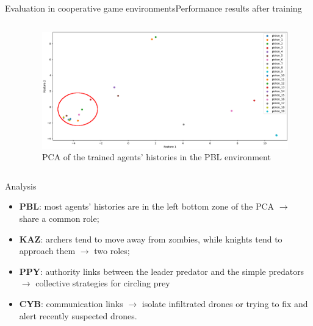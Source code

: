 \begin{frame}[allowframebreaks]{Evaluation in cooperative game environments}{Performance results after training}

    \begin{columns}

        \begin{column}{0.3\textwidth}
            { \tiny
                
            }

        \end{column}

        \hspace{1ex}

        \begin{column}{0.7\textwidth}
            \begin{figure}[h!]
                \centering
                \includegraphics[width=\textwidth]{figures/prahom_pca_analysis.png}
                \caption{PCA of the trained agents' histories in the PBL environment}
                \label{fig:prahom_pca_analysis}
            \end{figure}
        \end{column}

    \end{columns}

    \begin{block}{Analysis}
        \begin{itemize}
            \item \textbf{PBL}: most agents’ histories are in the left bottom zone of the PCA $\rightarrow$ share a common role;
            \item \textbf{KAZ}: archers tend to move away from zombies, while knights tend to approach them $\rightarrow$ two roles;
            \item \textbf{PPY}: authority links between the leader predator and the simple predators $\rightarrow$ collective strategies for circling prey
            \item \textbf{CYB}: communication links $\rightarrow$ isolate infiltrated drones or trying to fix and alert recently suspected drones.
        \end{itemize}
    \end{block}

\end{frame}
